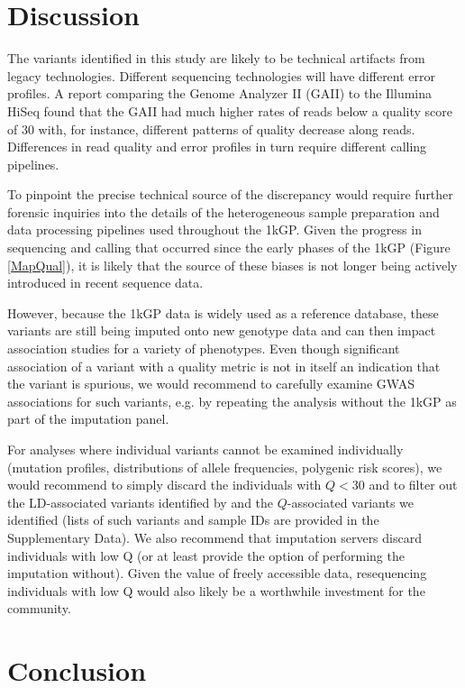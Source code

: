 \documentclass[9pt,article]{template}
\begin{document}
\section{Discussion}

The variants identified in this study are likely to be technical artifacts from legacy technologies.
Different sequencing technologies will have different error profiles. 
A report comparing the Genome Analyzer II (GAII) to the Illumina HiSeq found that the GAII had much higher rates of reads below a quality score of 30 \citep{Minoche2011} with, for instance, different patterns of quality decrease along reads. 
Differences in read quality and error profiles in turn require different calling pipelines.
 
To pinpoint the precise technical source of the discrepancy would require further forensic inquiries into the details of the heterogeneous sample preparation and data processing pipelines used throughout the 1kGP. 
Given the progress in sequencing and calling that occurred since the early phases of the 1kGP (Figure \ref{MapQual}), it is likely that the source of these biases is not longer being actively introduced in recent sequence data.

However, because the 1kGP data is widely used as a reference database, these variants are still being imputed onto new genotype data and can then impact association studies for a variety of phenotypes. 
Even though significant association of a variant with a quality metric is not in itself an indication that the variant is spurious, we would recommend to carefully examine GWAS associations for such variants, e.g. by repeating the analysis without the 1kGP as part of the imputation panel. 

For analyses where individual variants cannot be examined individually (mutation profiles, distributions of allele frequencies, polygenic risk scores), we would recommend to simply discard the individuals with $Q<30$ and to filter out the LD-associated variants identified by \cite{mafessoni2018turning} and the $Q$-associated variants we identified (lists of such variants and sample IDs are provided in the Supplementary Data). We also recommend that imputation servers discard individuals with low Q (or at least provide the option of performing the imputation without). Given the value of freely accessible data, resequencing individuals with low Q would  also likely be a worthwhile investment for the community. 

\section{Conclusion}
\end{document}
